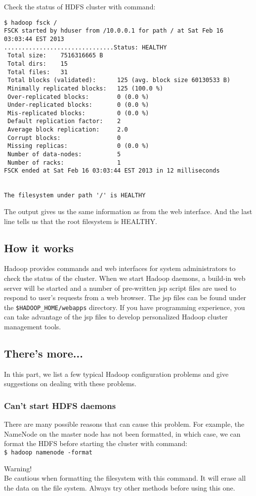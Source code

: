 Check the status of HDFS cluster with command:
\begin{verbatim}
$ hadoop fsck /
FSCK started by hduser from /10.0.0.1 for path / at Sat Feb 16 03:03:44 EST 2013
...............................Status: HEALTHY
 Total size:    7516316665 B
 Total dirs:    15
 Total files:   31
 Total blocks (validated):      125 (avg. block size 60130533 B)
 Minimally replicated blocks:   125 (100.0 %)
 Over-replicated blocks:        0 (0.0 %)
 Under-replicated blocks:       0 (0.0 %)
 Mis-replicated blocks:         0 (0.0 %)
 Default replication factor:    2
 Average block replication:     2.0
 Corrupt blocks:                0
 Missing replicas:              0 (0.0 %)
 Number of data-nodes:          5
 Number of racks:               1
FSCK ended at Sat Feb 16 03:03:44 EST 2013 in 12 milliseconds


The filesystem under path '/' is HEALTHY
\end{verbatim}

The output gives us the same information as from the web interface. And the last line tells us that the root filesystem is HEALTHY.
\subsection*{How it works}
Hadoop provides commands and web interfaces for system administrators to check the status of the cluster. When we start Hadoop daemons, a build-in web server will be started and a number of pre-written jsp script files are used to respond to user's requests from a web browser. The jsp files can be found under the \verb|$HADOOP_HOME/webapps| directory. If you have programming experience, you can take advantage of the jsp files to develop personalized Hadoop cluster management tools.

\subsection*{There's more...}
In this part, we list a few typical Hadoop configuration problems and give suggestions on dealing with these problems.

\subsubsection*{Can't start HDFS daemons}
There are many possible reasons that can cause this problem. For example, the NameNode on the master node has not been formatted, in which case, we can format the HDFS before starting the cluster with command: \\
\verb|$ hadoop namenode -format|
\begin{warning}
Warning! \\
Be cautious when formatting the filesystem with this command. It will erase all the data on the file system. Always try other methods before using this one.
\end{warning}

